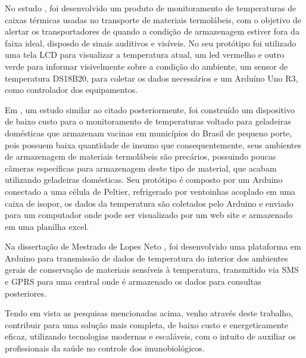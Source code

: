 No estudo \cite{lima2019controle}, foi desenvolvido um produto de monitoramento de temperaturas de caixas térmicas usadas no transporte de materiais termolábeis, com o  objetivo de alertar os transportadores de quando a condição de armazenagem estiver fora da faixa ideal, disposdo de sinais auditivos e visíveis. No seu protótipo foi utilizado uma tela LCD para visualizar a temperatura atual, um led vermelho e outro verde para informar visivelmente sobre a condição do ambiente, um sensor de temperatura DS18B20, para coletar os dados necessários e um Arduíno Uno R3, como controlador dos equipamentos.

Em \cite{kersbaum2019monitoramento}, um estudo similar ao citado posteriormente, foi construído um dispositivo de baixo custo para o monitoramento de temperaturas voltado para geladeiras domésticas que armazenam vacinas em municípios do Brasil de pequeno porte, pois possuem baixa quantidade de insumo que consequentemente, seus ambientes de armazenagem de materiais termolábeis são precários, possuindo poucas câmeras específicas para armazenagem deste tipo de material, que acabam utilizando geladeiras domésticas. Seu protótipo é composto por um Arduino conectado a uma célula de Peltier, refrigerado por ventoinhas acoplado em uma caixa de isopor, os dados da temperatura são coletados pelo Arduino e enviado para um computador onde pode ser visualizado por um web site e armazenado em uma planilha excel.

Na dissertação de Mestrado de Lopes Neto \cite{lopes2019monitoramento}, foi desenvolvido uma plataforma em Arduino para transmissão de dados de temperatura do interior dos ambientes gerais de conservação de materiais sensíveis à temperatura, transmitido via SMS e GPRS para uma central onde é armazenado os dados para consultas posteriores.

Tendo em vista as pesquisas mencionadas acima, venho através deste trabalho, contribuir para uma solução mais completa, de baixo custo e energeticamente eficaz, utilizando tecnologias modernas e escaláveis, com o intuito de auxiliar os profissionais da saúde no controle dos imunobiológicos.